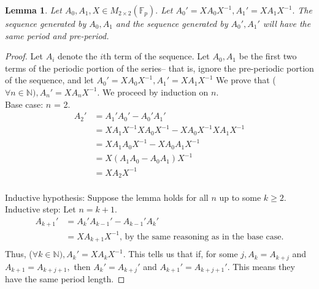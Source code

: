 \documentclass[12pt, letterpaper]{article}
\newtheorem{lemma}[theorem]{Lemma}
\theoremstyle{definition}
\newcommand{\M}{M_{2\times 2}(\mathbb{F}_p)}
\begin{document}
\begin{lemma}
Let $A_0, A_1,X\in\M.$ Let $A_0' = XA_0X^{-1}, A_1' = XA_1X^{-1}.$ The sequence generated by $A_0,A_1$ and the sequence generated by $A_0',A_1'$ will have the same period and pre-period.
\end{lemma}
\begin{proof}
Let $A_i$ denote the $i$th term of the sequence. Let $A_0, A_1$ be the first two terms of the periodic portion of the series-- that is, ignore the pre-periodic portion of the sequence, and let $A_0' = XA_0X^{-1}, A_1' = XA_1X^{-1}$ We prove that ($\forall n\in \mathbb{N}), A_n' = XA_nX^{-1}$. We proceed by induction on $n$.
\\Base case: $n$ = 2.
\begin{align*}
A_2' &=  A_1'A_0'-A_0'A_1' \\
&= XA_1X^{-1}XA_0X^{-1}-XA_0X^{-1}XA_1X^{-1} \\
&=XA_1A_0X^{-1}- XA_0A_1X^{-1} \\
&= X(A_1A_0-A_0A_1)X^{-1} \\
&= XA_2X^{-1}
\end{align*}
\\Inductive hypothesis: Suppose the lemma holds for all $n$ up to some $k \geq 2$.
\\Inductive step: Let $n = k+1$.
\begin{align*}
A_{k+1}' &= A_k'A_{k-1}'-A_{k-1}'A_k' \\
&= XA_{k+1}X^{-1} \text{, by the same reasoning as in the base case.} \\
\end{align*}
Thus, ($\forall k\in \mathbb{N}), A_k' = XA_kX^{-1}$. This tells us that if, for some $j, A_k = A_{k+j}$ and $A_{k+1} = A_{k+j+1},$ then $A_k' = A_{k+j}'$ and $A_{k+1}' = A_{k+j+1}'$. This means they have the same period length.
\end{proof}
\end{document}
